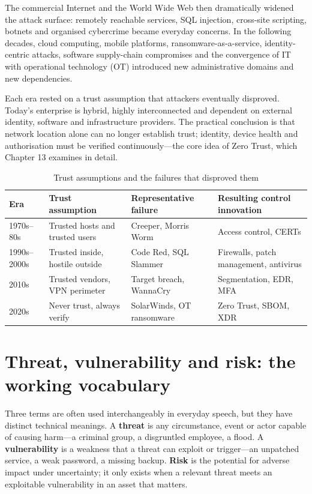 The commercial Internet and the World Wide Web then dramatically widened the attack surface: remotely reachable services, SQL injection, cross-site scripting, botnets and organised cybercrime became everyday concerns. In the following decades, cloud computing, mobile platforms, ransomware-as-a-service, identity-centric attacks, software supply-chain compromises and the convergence of IT with operational technology (OT) introduced new administrative domains and new dependencies.

Each era rested on a trust assumption that attackers eventually disproved. Today's enterprise is hybrid, highly interconnected and dependent on external identity, software and infrastructure providers. The practical conclusion is that network location alone can no longer establish trust; identity, device health and authorisation must be verified continuously—the core idea of Zero Trust, which Chapter 13 examines in detail.

\begin{table}[htbp]
  \centering\small
  \caption{Trust assumptions and the failures that disproved them}
  \begin{tabularx}{\linewidth}{>{\raggedright\arraybackslash}X >{\raggedright\arraybackslash}X >{\raggedright\arraybackslash}X >{\raggedright\arraybackslash}X}
    \toprule
    \textbf{Era} & \textbf{Trust assumption} & \textbf{Representative failure} & \textbf{Resulting control innovation} \\
    \midrule
    1970s–80s & Trusted hosts and trusted users & Creeper, Morris Worm & Access control, CERTs \\
    1990s–2000s & Trusted inside, hostile outside & Code Red, SQL Slammer & Firewalls, patch management, antivirus \\
    2010s & Trusted vendors, VPN perimeter & Target breach, WannaCry & Segmentation, EDR, MFA \\
    2020s & Never trust, always verify & SolarWinds, OT ransomware & Zero Trust, SBOM, XDR \\
    \bottomrule
  \end{tabularx}
\end{table}
\section{Threat, vulnerability and risk: the working vocabulary}\label{sec:1.5}
Three terms are often used interchangeably in everyday speech, but they have distinct technical meanings. A \textbf{threat} is any circumstance, event or actor capable of causing harm—a criminal group, a disgruntled employee, a flood. A \textbf{vulnerability} is a weakness that a threat can exploit or trigger—an unpatched service, a weak password, a missing backup. \textbf{Risk} is the potential for adverse impact under uncertainty; it only exists when a relevant threat meets an exploitable vulnerability in an asset that matters.

